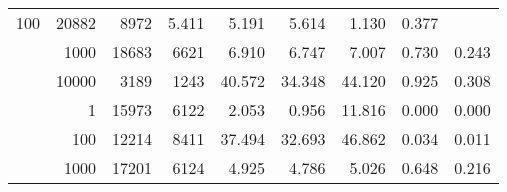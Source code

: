 \begin{table}
\begin{tabular}{rrrrrrrrr}
					\multirow{ 1 }{*}{ 100 } &
					
						
							    
							     20882  & 8972  
	                           & 5.411 & 5.191 & 5.614
	                           & 1.130 & 0.377  \\
	                
	            
					 &  
					 
					\multirow{ 1 }{*}{ 1000 } &
					
						
							    
							     18683  & 6621  
	                           & 6.910 & 6.747 & 7.007
	                           & 0.730 & 0.243  \\
	                
	            
					 &  
					 
					\multirow{ 1 }{*}{ 10000 } &
					
						
							    
							     3189  & 1243  
	                           & 40.572 & 34.348 & 44.120
	                           & 0.925 & 0.308  \\
	                
	            
	        
				\noalign{\smallskip}\hline
				\multirow{ 4 }{*}{ 250000 } &
				
					
					 
					\multirow{ 1 }{*}{ 1 } &
					
						
							    
							     15973  & 6122  
	                           & 2.053 & 0.956 & 11.816
	                           & 0.000 & 0.000  \\
	                
	            
					 &  
					 
					\multirow{ 1 }{*}{ 100 } &
					
						
							    
							     12214  & 8411  
	                           & 37.494 & 32.693 & 46.862
	                           & 0.034 & 0.011  \\
	                
	            
					 &  
					 
					\multirow{ 1 }{*}{ 1000 } &
					
						
							    
							     17201  & 6124  
	                           & 4.925 & 4.786 & 5.026
	                           & 0.648 & 0.216  \\
	                

\end{tabular}
\end{table}
